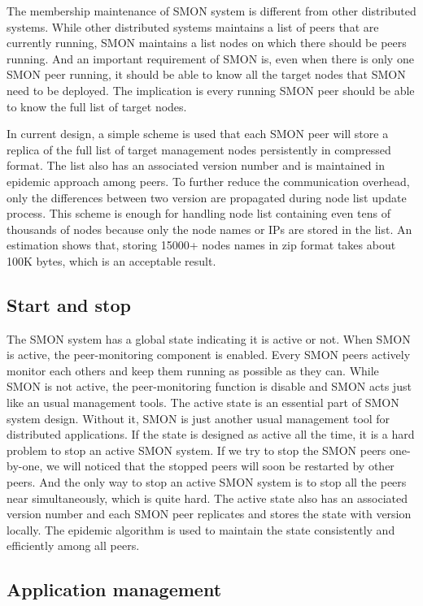 The membership maintenance of SMON system is different from
other distributed systems. While other distributed systems
maintains a list of peers that are currently running, SMON
maintains a list nodes on which there should be peers
running.  And an important requirement of SMON is, even when
there is only one SMON peer running, it should be able to
know all the target nodes that SMON need to be deployed. The
implication is every running SMON peer should be able to
know the full list of target nodes.

In current design, a simple scheme is used that each SMON
peer will store a replica of the full list of target
management nodes persistently in compressed format. The list
also has an associated version number and is maintained in
epidemic approach among peers. To further reduce the
communication overhead, only the differences between two
version are propagated during node list update process. This
scheme is enough for handling node list containing even tens
of thousands of nodes because only the node names or IPs are
stored in the list.  An estimation shows that, storing
15000+ nodes names in zip format takes about 100K bytes,
which is an acceptable result.

\subsection{Start and stop}

The SMON system has a global state indicating it is active
or not. When SMON is active, the peer-monitoring component
is enabled. Every SMON peers actively monitor each others
and keep them running as possible as they can. While SMON is
not active, the peer-monitoring function is disable and SMON
acts just like an usual management tools. The active state
is an essential part of SMON system design. Without it, SMON
is just another usual management tool for distributed
applications. If the state is designed as active all the
time, it is a hard problem to stop an active SMON system. If
we try to stop the SMON peers one-by-one, we will noticed
that the stopped peers will soon be restarted by other
peers. And the only way to stop an active SMON system is to
stop all the peers near simultaneously, which is quite hard.
The active state also has an associated version number and
each SMON peer replicates and stores the state with version
locally.  The epidemic algorithm is used to maintain the
state consistently and efficiently among all peers.

\subsection{Application management}

